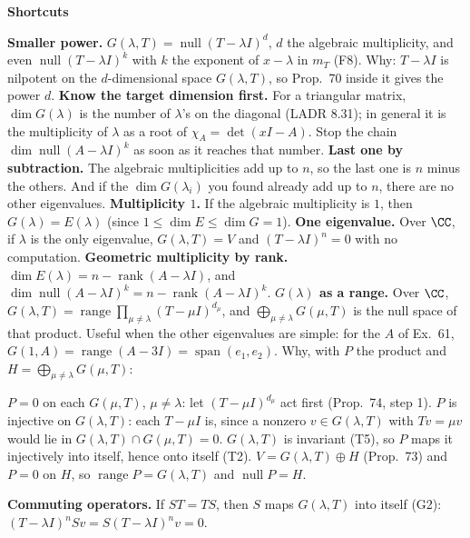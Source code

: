 \documentclass[10pt]{scrartcl}
\DeclareMathOperator{\nul}{null}
\DeclareMathOperator{\range}{range}
\DeclareMathOperator{\spn}{span}
\newenvironment{shortcuts}{\begin{mdframed}[style=fastboxstyle]\textbf{\color{NavyBlue}Shortcuts}\begin{itemize}[itemsep=2pt,topsep=2pt]}{\end{itemize}\end{mdframed}}
\begin{document}
\begin{shortcuts}
  \ii \textbf{Smaller power.} $G(\lambda,T)=\nul(T-\lambda I)^{d}$, $d$ the algebraic multiplicity, and even $\nul(T-\lambda I)^{k}$ with $k$ the exponent of $x-\lambda$ in $m_T$ (F8). Why: $T-\lambda I$ is nilpotent on the $d$-dimensional space $G(\lambda,T)$, so Prop.~70 inside it gives the power $d$.
  \ii \textbf{Know the target dimension first.} For a triangular matrix, $\dim G(\lambda)$ is the number of $\lambda$'s on the diagonal (LADR 8.31); in general it is the multiplicity of $\lambda$ as a root of $\chi_A=\det(xI-A)$. Stop the chain $\dim\nul(A-\lambda I)^k$ as soon as it reaches that number.
  \ii \textbf{Last one by subtraction.} The algebraic multiplicities add up to $n$, so the last one is $n$ minus the others. And if the $\dim G(\lambda_i)$ you found already add up to $n$, there are no other eigenvalues.
  \ii \textbf{Multiplicity $1$.} If the algebraic multiplicity is $1$, then $G(\lambda)=E(\lambda)$ (since $1\le\dim E\le\dim G=1$).
  \ii \textbf{One eigenvalue.} Over $\CC$, if $\lambda$ is the only eigenvalue, $G(\lambda,T)=V$ and $(T-\lambda I)^n=0$ with no computation.
  \ii \textbf{Geometric multiplicity by rank.} $\dim E(\lambda)=n-\operatorname{rank}(A-\lambda I)$, and $\dim\nul(A-\lambda I)^k=n-\operatorname{rank}(A-\lambda I)^k$.
  \ii \textbf{$G(\lambda)$ as a range.} Over $\CC$, $G(\lambda,T)=\range\prod_{\mu\ne\lambda}(T-\mu I)^{d_\mu}$, and $\bigoplus_{\mu\ne\lambda}G(\mu,T)$ is the null space of that product. Useful when the other eigenvalues are simple: for the $A$ of Ex.~61, $G(1,A)=\range(A-3I)=\spn(e_1,e_2)$. Why, with $P$ the product and $H=\bigoplus_{\mu\ne\lambda}G(\mu,T)$:
  \begin{enumerate}[label=\arabic*.,itemsep=1pt]
    \ii $P=0$ on each $G(\mu,T)$, $\mu\ne\lambda$: let $(T-\mu I)^{d_\mu}$ act first (Prop.~74, step 1).
    \ii $P$ is injective on $G(\lambda,T)$: each $T-\mu I$ is, since a nonzero $v\in G(\lambda,T)$ with $Tv=\mu v$ would lie in $G(\lambda,T)\cap G(\mu,T)=0$.
    \ii $G(\lambda,T)$ is invariant (T5), so $P$ maps it injectively into itself, hence onto itself (T2).
    \ii $V=G(\lambda,T)\oplus H$ (Prop.~73) and $P=0$ on $H$, so $\range P=G(\lambda,T)$ and $\nul P=H$.
  \end{enumerate}
  \ii \textbf{Commuting operators.} If $ST=TS$, then $S$ maps $G(\lambda,T)$ into itself (G2): $(T-\lambda I)^nSv=S(T-\lambda I)^nv=0$.
\end{shortcuts}
\end{document}
